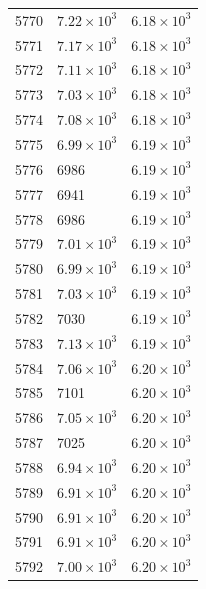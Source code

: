 \begin{table}[H]
\begin{tabular}{lll}
5770 & $\displaystyle 7.22 \times 10^{3}$ & $\displaystyle 6.18 \times 10^{3}$ \\
5771 & $\displaystyle 7.17 \times 10^{3}$ & $\displaystyle 6.18 \times 10^{3}$ \\
5772 & $\displaystyle 7.11 \times 10^{3}$ & $\displaystyle 6.18 \times 10^{3}$ \\
5773 & $\displaystyle 7.03 \times 10^{3}$ & $\displaystyle 6.18 \times 10^{3}$ \\
5774 & $\displaystyle 7.08 \times 10^{3}$ & $\displaystyle 6.18 \times 10^{3}$ \\
5775 & $\displaystyle 6.99 \times 10^{3}$ & $\displaystyle 6.19 \times 10^{3}$ \\
5776 & 6986 & $\displaystyle 6.19 \times 10^{3}$ \\
5777 & 6941 & $\displaystyle 6.19 \times 10^{3}$ \\
5778 & 6986 & $\displaystyle 6.19 \times 10^{3}$ \\
5779 & $\displaystyle 7.01 \times 10^{3}$ & $\displaystyle 6.19 \times 10^{3}$ \\
5780 & $\displaystyle 6.99 \times 10^{3}$ & $\displaystyle 6.19 \times 10^{3}$ \\
5781 & $\displaystyle 7.03 \times 10^{3}$ & $\displaystyle 6.19 \times 10^{3}$ \\
5782 & 7030 & $\displaystyle 6.19 \times 10^{3}$ \\
5783 & $\displaystyle 7.13 \times 10^{3}$ & $\displaystyle 6.19 \times 10^{3}$ \\
5784 & $\displaystyle 7.06 \times 10^{3}$ & $\displaystyle 6.20 \times 10^{3}$ \\
5785 & 7101 & $\displaystyle 6.20 \times 10^{3}$ \\
5786 & $\displaystyle 7.05 \times 10^{3}$ & $\displaystyle 6.20 \times 10^{3}$ \\
5787 & 7025 & $\displaystyle 6.20 \times 10^{3}$ \\
5788 & $\displaystyle 6.94 \times 10^{3}$ & $\displaystyle 6.20 \times 10^{3}$ \\
5789 & $\displaystyle 6.91 \times 10^{3}$ & $\displaystyle 6.20 \times 10^{3}$ \\
5790 & $\displaystyle 6.91 \times 10^{3}$ & $\displaystyle 6.20 \times 10^{3}$ \\
5791 & $\displaystyle 6.91 \times 10^{3}$ & $\displaystyle 6.20 \times 10^{3}$ \\
5792 & $\displaystyle 7.00 \times 10^{3}$ & $\displaystyle 6.20 \times 10^{3}$ \\

\end{tabular}
\end{table}

